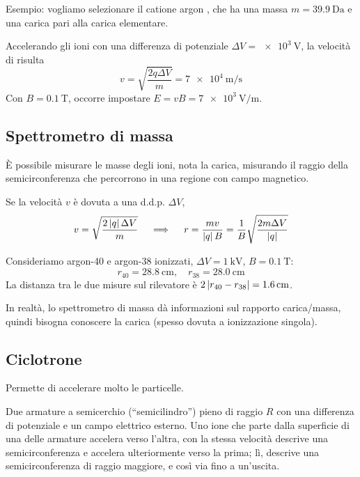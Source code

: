 Esempio: vogliamo selezionare il catione argon , che ha una massa $m = \qty{39.9}{\dalton}$ e una carica pari alla carica elementare.

Accelerando gli ioni con una differenza di potenziale $\Delta V = \qty{e3}{\volt}$, la velocità di  risulta
\begin{equation}
    v = \sqrt{\frac{2q\Delta V}{m}} = \qty{7e4}{\metre\per\second}
\end{equation}
Con $B = \qty{0.1}{\tesla}$, occorre impostare $E = vB = \qty{7e3}{\volt\per\metre}$.

\subsection{Spettrometro di massa}
\label{sec:spettrometro_massa}

È possibile misurare le masse degli ioni, nota la carica, misurando il raggio della semicirconferenza che percorrono in una regione con campo magnetico.

Se la velocità $v$ è dovuta a una d.d.p. $\Delta V$,
\begin{equation}
    v = \sqrt{\frac{2 \left\lvert q \right\rvert \Delta V}{m}}
    \quad \implies \quad
    r = \frac{mv}{\left\lvert q \right\rvert B} = \frac{1}{B}\sqrt{\frac{2 m \Delta V}{\left\lvert q \right\rvert}}
\end{equation}


Consideriamo argon-40 e argon-38 ionizzati, $\Delta V = \qty{1}{\kilo\volt}$, $B = \qty{0.1}{\tesla}$:
\begin{equation}
    r_{40} = \qty{28.8}{\centi\metre}, \quad r_{38} = \qty{28.0}{\centi\metre}
\end{equation}
La distanza tra le due misure sul rilevatore è $2 \left\lvert r_{40} - r_{38} \right\rvert = \qty{1.6}{\centi\metre}$.

In realtà, lo spettrometro di massa dà informazioni sul rapporto carica/massa, quindi bisogna conoscere la carica (spesso dovuta a ionizzazione singola).


\subsection{Ciclotrone}


Permette di accelerare molto le particelle.

Due armature a semicerchio (``semicilindro'') pieno di raggio $R$ con una differenza di potenziale e un campo elettrico esterno.
Uno ione che parte dalla superficie di una delle armature accelera verso l'altra, con la stessa velocità descrive una semicirconferenza e accelera ulteriormente verso la prima; lì, descrive una semicirconferenza di raggio maggiore, e così via fino a un'uscita.

